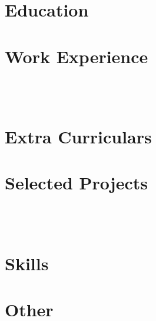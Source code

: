 \documentclass[a4paper,11pt]{article}
\begin{document}
\pagestyle{empty}



\section{Education}


\section{Work Experience}
 \\[5pt]
  \\[5pt]

% 
% 


\section{Extra Curriculars}



\section{Selected Projects}
 \\[5pt]
 \\[5pt]

% 

% 
% 
% 
% 
%

\section{Skills}


\section{Other}

\end{document}
